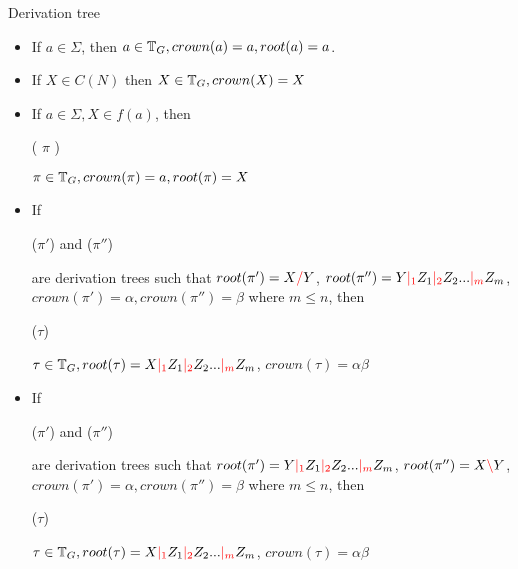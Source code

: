 \documentclass[main.tex]{subfiles}
\begin{document}
\begin{defn}
    Derivation tree
    \begin{itemize}
        \item If $ a \in \Sigma $, then
            $ a \in \mathbb{T}_{ G }, crown(a) = a, root(a) = a$.
        \item If $ X \in C(N) $ then $ X \in \mathbb{T}_{ G }, crown(X) = X$
        \item If $ a \in \Sigma, X \in f(a) $, then
            \begin{center}
                 ( $ \pi $ )
            \end{center}
            $ \pi \in \mathbb{T}_{ G }, crown(\pi) = a, root(\pi) = X$
        \item If
            \begin{center}
                 ($\pi'$)
                \quad and \quad
                 ($\pi''$)
            \end{center}

            are derivation trees such that $ root(\pi') = X \textcolor{red}{/} Y $,
            $ root(\pi'') = Y \textcolor{red}{|_{1}} Z_1 \textcolor{red}{|_{2}} Z_2 ... \textcolor{red}{|_{m}} Z_m $,
            $ crown(\pi') = \alpha, crown(\pi'') = \beta $
            where $m \leq n$, then
            \begin{center}
                 ($\tau$)
            \end{center}
            $ \tau \in \mathbb{T}_{ G }, root(\tau) = X \textcolor{red}{|_{1}} Z_1 \textcolor{red}{|_{2}} Z_2 ... \textcolor{red}{|_{m}} Z_m $,
            $ crown(\tau) = \alpha \beta$
        \item If
            \begin{center}
                 ($\pi'$)
                \quad and \quad
                 ($\pi''$)
            \end{center}
            are derivation trees such that
            $ root(\pi') = Y \textcolor{red}{|_{1}} Z_1 \textcolor{red}{|_{2}} Z_2 ... \textcolor{red}{|_{m}} Z_m $,
            $ root(\pi'') = X \textcolor{red}{\backslash} Y $,
            $ crown(\pi') = \alpha, crown(\pi'') = \beta $
            where $m \leq n$, then
            \begin{center}
                 ($\tau$)
            \end{center}
            $ \tau \in \mathbb{T}_{ G }, root(\tau) = X \textcolor{red}{|_{1}} Z_1 \textcolor{red}{|_{2}} Z_2 ... \textcolor{red}{|_{m}} Z_m $,
            $ crown(\tau) = \alpha \beta $
    \end{itemize}
\end{defn}
\end{document}
